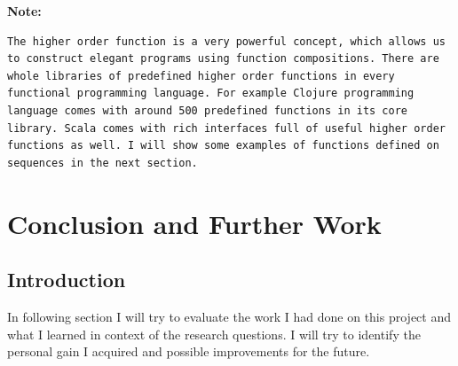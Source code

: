 \documentclass[12pt,twoside,a4paper]{report}
\begin{document}
\textbf{Note:}
\begin{lstlisting}
The higher order function is a very powerful concept, which allows us to construct elegant programs using function compositions. There are whole libraries of predefined higher order functions in every functional programming language. For example Clojure programming language comes with around 500 predefined functions in its core library. Scala comes with rich interfaces full of useful higher order functions as well. I will show some examples of functions defined on sequences in the next section.
\end{lstlisting}









\chapter{Conclusion and Further Work}\label{7}

\section{Introduction}\label{7.1}
In following section I will try to evaluate the work I had done on this project and what I learned in context of the research questions. I will try to identify the personal gain I acquired and possible improvements for the future.

\end{document}
